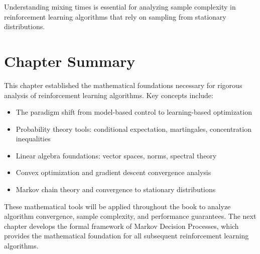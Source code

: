 Understanding mixing times is essential for analyzing sample complexity in reinforcement learning algorithms that rely on sampling from stationary distributions.

\section{Chapter Summary}

This chapter established the mathematical foundations necessary for rigorous analysis of reinforcement learning algorithms. Key concepts include:

\begin{itemize}
    \item The paradigm shift from model-based control to learning-based optimization
    \item Probability theory tools: conditional expectation, martingales, concentration inequalities
    \item Linear algebra foundations: vector spaces, norms, spectral theory
    \item Convex optimization and gradient descent convergence analysis
    \item Markov chain theory and convergence to stationary distributions
\end{itemize}

These mathematical tools will be applied throughout the book to analyze algorithm convergence, sample complexity, and performance guarantees. The next chapter develops the formal framework of Markov Decision Processes, which provides the mathematical foundation for all subsequent reinforcement learning algorithms.